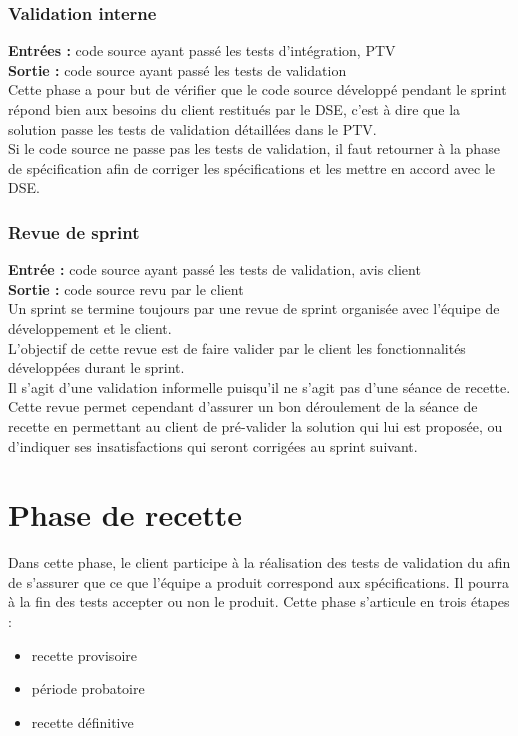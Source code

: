 \subsubsection{Validation interne}

\textbf{Entrées :} code source ayant passé les tests d’intégration, PTV \\
\textbf{Sortie : } code source ayant passé les tests de validation \\
Cette phase a pour but de vérifier que le code source développé pendant le sprint répond bien aux besoins du client restitués par le DSE, c’est à dire que la solution passe les tests de validation détaillées dans le PTV.\\
Si le code source ne passe pas les tests de validation, il faut retourner à la phase de spécification afin de corriger les spécifications et les mettre en accord avec le DSE.

\subsubsection{Revue de sprint}
\textbf{Entrée :} code source ayant passé les tests de validation, avis client \\
\textbf{Sortie :} code source revu par le client \\

Un sprint se termine toujours par une revue de sprint organisée avec l’équipe de développement et le client. \\
L’objectif de cette revue est de faire valider par le client les fonctionnalités développées durant le sprint.\\ 
Il s’agit d’une validation informelle puisqu’il ne s’agit pas d’une séance de
recette. Cette revue permet cependant d’assurer un bon déroulement de la séance de recette en permettant au client de pré-valider la solution qui lui est proposée, ou d’indiquer ses insatisfactions qui seront corrigées au sprint suivant. \\


\section{Phase de recette}
\label{recette}

Dans cette phase, le client participe à la réalisation des tests de validation du \PTV{} afin de s’assurer que ce que l’équipe a produit correspond aux spécifications. Il pourra à la fin des tests accepter ou non le produit.
Cette phase s’articule en trois étapes : 
\begin{itemize}
\item recette provisoire
\item période probatoire 
\item recette définitive
\end{itemize}


